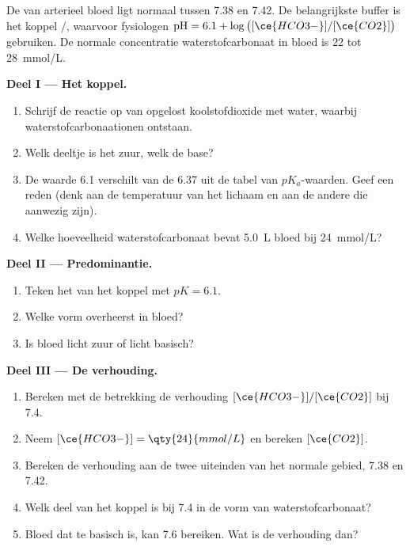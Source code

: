 \begin{problem}
\label{pb:g12:buffers-predominance:1}
De  van arterieel bloed ligt normaal tussen 7.38 en 7.42. De
belangrijkste buffer is het koppel /, waarvoor
fysiologen
$\mathrm{pH} = 6.1 + \log\big([\ce{HCO3-}]/[\ce{CO2}]\big)$ gebruiken. De
normale concentratie waterstofcarbonaat in bloed is 22 tot
\qty{28}{mmol/L}.

\medskip
\noindent\textbf{Deel I --- Het koppel.}
\begin{enumerate}
  \item Schrijf de reactie op van opgelost koolstofdioxide met water,
        waarbij waterstofcarbonaationen ontstaan.
  \item Welk deeltje is het zuur, welk de base?
  \item De waarde 6.1 verschilt van de 6.37 uit de tabel van
        $pK_a$-waarden. Geef een reden (denk aan de temperatuur van het
        lichaam en aan de andere  die aanwezig zijn).
  \item Welke hoeveelheid waterstofcarbonaat bevat \qty{5.0}{L} bloed
        bij \qty{24}{mmol/L}?
\end{enumerate}

\medskip
\noindent\textbf{Deel II --- Predominantie.}
\begin{enumerate}[resume]
  \item Teken het  van het koppel met $pK = 6.1$.
  \item Welke vorm overheerst in bloed?
  \item Is bloed licht zuur of licht basisch?
\end{enumerate}

\medskip
\noindent\textbf{Deel III --- De verhouding.}
\begin{enumerate}[resume]
  \item Bereken met de betrekking de verhouding $[\ce{HCO3-}]/[\ce{CO2}]$
        bij  7.4.
  \item Neem $[\ce{HCO3-}] = \qty{24}{mmol/L}$ en bereken $[\ce{CO2}]$.
  \item Bereken de verhouding aan de twee uiteinden van het normale
        gebied, 7.38 en 7.42.
  \item Welk deel van het koppel is bij  7.4 in de vorm van
        waterstofcarbonaat?
  \item Bloed dat te basisch is, kan  7.6 bereiken. Wat is de
        verhouding dan?
\end{enumerate}


\end{problem}
